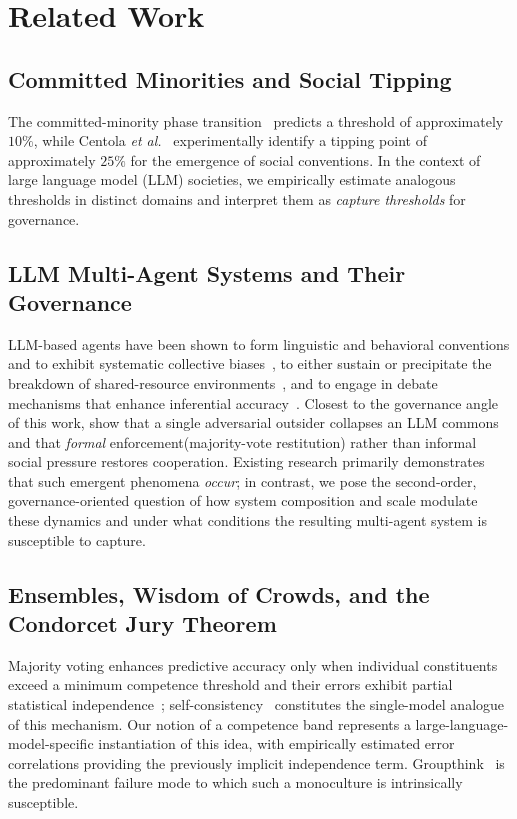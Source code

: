 \documentclass[manuscript,screen,review]{acmart}
\begin{document}
\section{Related Work}
\subsection{Committed Minorities and Social Tipping}
The committed-minority phase transition~\cite{xie2011} predicts a threshold of approximately $10\%$, while Centola \emph{et al.}~\cite{centola2018} experimentally identify a tipping point of approximately $25\%$ for the emergence of social conventions. In the context of large language model (LLM) societies, we empirically estimate analogous thresholds in distinct domains and interpret them as \emph{capture thresholds} for governance.

\subsection{LLM Multi-Agent Systems and Their Governance}
LLM-based agents have been shown to form linguistic and behavioral conventions and to exhibit systematic collective biases~\cite{ashery2025}, to either sustain or precipitate the breakdown of shared-resource environments~\cite{piatti2024,hardin1968}, and to engage in debate mechanisms that enhance inferential accuracy~\cite{du2024debate}. Closest to the governance angle of this work, \citet{bell2026restitution} show that a single adversarial outsider collapses an LLM commons and that \emph{formal} enforcement(majority-vote restitution) rather than informal social pressure restores cooperation. Existing research primarily demonstrates that such emergent phenomena \emph{occur}; in contrast, we pose the second-order, governance-oriented question of how system composition and scale modulate these dynamics and under what conditions the resulting multi-agent system is susceptible to capture.

\subsection{Ensembles, Wisdom of Crowds, and the Condorcet Jury Theorem}
Majority voting enhances predictive accuracy only when individual constituents exceed a minimum competence threshold and their errors exhibit partial statistical independence~\cite{condorcet}; self-consistency~\cite{wang2023selfconsistency} constitutes the single-model analogue of this mechanism. Our notion of a competence band represents a large-language-model-specific instantiation of this idea, with empirically estimated error correlations providing the previously implicit independence term. Groupthink~\cite{janis1972} is the predominant failure mode to which such a monoculture is intrinsically susceptible.
\end{document}
